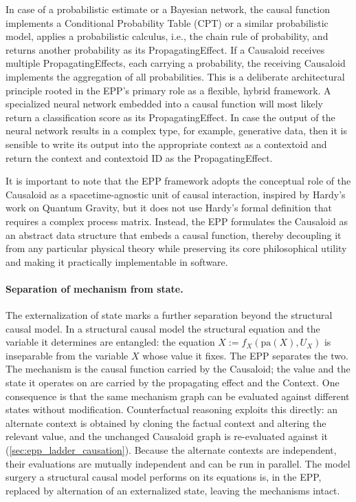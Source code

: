 In case of a probabilistic estimate or a Bayesian network, the causal function implements a Conditional Probability Table (CPT) or a similar probabilistic model, applies a probabilistic calculus, i.e., the chain rule of probability, and returns another probability as its PropagatingEffect. If a Causaloid receives multiple PropagatingEffects, each carrying a probability, the receiving Causaloid implements the aggregation of all probabilities. This is a deliberate architectural principle rooted in the EPP's primary role as a flexible, hybrid framework. A specialized neural network embedded into a causal function will most likely return a classification score as its PropagatingEffect. In case the output of the neural network results in a complex type, for example, generative data, then it is sensible to write its output into the appropriate context as a contextoid and return the context and contextoid ID as the PropagatingEffect. 


It is important to note that the EPP framework adopts the conceptual role of the Causaloid as a spacetime-agnostic unit of causal interaction, inspired by Hardy’s work on Quantum Gravity, but it does not use Hardy's formal definition that requires a complex process matrix.  Instead, the EPP formulates the Causaloid as an abstract data structure that embeds a causal function, thereby decoupling it from any particular physical theory while preserving its core philosophical utility and making it practically implementable in software.

\paragraph{Separation of mechanism from state.}
The externalization of state marks a further separation beyond the structural causal model. In a structural causal model the structural equation and the variable it determines are entangled: the equation $X := f_X(\mathrm{pa}(X), U_X)$ is inseparable from the variable $X$ whose value it fixes. The EPP separates the two. The mechanism is the causal function carried by the Causaloid; the value and the state it operates on are carried by the propagating effect and the Context. One consequence is that the same mechanism graph can be evaluated against different states without modification. Counterfactual reasoning exploits this directly: an alternate context is obtained by cloning the factual context and altering the relevant value, and the unchanged Causaloid graph is re-evaluated against it (\ref{sec:epp_ladder_causation}). Because the alternate contexts are independent, their evaluations are mutually independent and can be run in parallel. The model surgery a structural causal model performs on its equations is, in the EPP, replaced by alternation of an externalized state, leaving the mechanisms intact.


